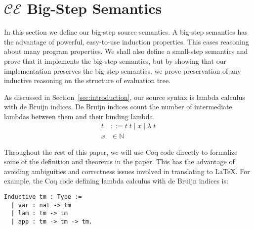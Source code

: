 \section{$\mathcal{CE}$ Big-Step Semantics} \label{sec:cem_big}

In this section we define our big-step source semantics. A big-step semantics
has the advantage of powerful, easy-to-use induction properties. This eases
reasoning about many program properties. We shall also define a small-step
semantics and prove that it implements the big-step semantics, but by showing
that our implementation preserves the big-step semantics, we prove preservation
of any inductive reasoning on the structure of evaluation tree.  

As discussed in Section~\ref{sec:introduction}, our source syntax is lambda calculus with
de Bruijn indices. De Bruijn indices count the number of intermediate lambdas
between them and their binding lambda.  
\begin{align*}
 t &::= t \; t \; | \; x \; | \;  \lambda \; t \\
 x &\in \mathbb{N}
\end{align*}

Throughout the rest of this paper, we will use Coq code directly to formalize
some of the definition and theorems in the paper. This has the advantage of
avoiding ambiguities and correctness issues involved in translating to \LaTeX.
For example, the Coq code defining lambda calculus with de Bruijn indices is: 

\begin{lstlisting}
Inductive tm : Type := 
  | var : nat -> tm 
  | lam : tm -> tm
  | app : tm -> tm -> tm.
\end{lstlisting}

